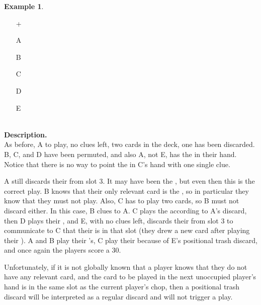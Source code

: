 \documentclass[a4paper]{article}
\theoremstyle{plain}
\theoremstyle{definition}
\newtheorem{example}[theorem]{Example}
\begin{document}
\begin{example}	\hfill \\
	\begin{minipage}{0.45\textwidth}
		\begin{itemize}
			\item[\Large +]      
			\item[\Large A]    
			\item[\Large B]    
			\item[\Large C]    
			\item[\Large D]    
			\item[\Large E]    
		\end{itemize}
	\end{minipage}%
	\begin{minipage}{0.55\textwidth}
		\hfill \\
		
		\textbf{Description.} \\
		
		As before, A to play, no clues left, two cards in the deck, one  has been discarded. B, C, and D have been permuted, and also A, not E, has the  in their hand. Notice that there is no way to point the  in C's hand with one single clue.
			
		A still discards their  from slot 3. It may have been the , but even then this is the correct play. B knows that their only relevant card is the , so in particular they know that they must not play. Also, C has to play two cards, so B must not discard either. In this case, B clues  to A. C plays the  according to A's discard, then D plays their , and E, with no clues left, discards their  from slot 3 to communicate to C that their  is in that slot (they drew a new card after playing their ). A and B play their 's, C play their  because of E's positional trash discard, and once again the players score a 30.
	\end{minipage}
\end{example} \vspace{0.15 cm}

Unfortunately, if it is not globally known that a player knows that they do not have any relevant card, and the card to be played in the next unoccupied player's hand is in the same slot as the current player's chop, then a positional trash discard will be interpreted as a regular discard and will not trigger a play.
\end{document}
